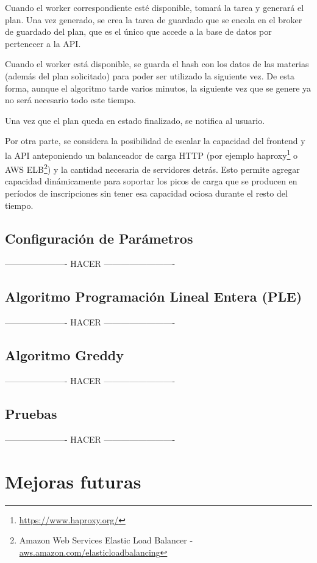 \documentclass[a4paper]{article}
\begin{document}
Cuando el worker correspondiente esté disponible, tomará la tarea y generará el plan. Una vez generado, se crea la tarea de guardado que se encola en el broker de guardado del plan, que es el único que accede a la base de datos por pertenecer a la API.

Cuando el worker está disponible, se guarda el hash con los datos de las materias (además del plan solicitado) para poder ser utilizado la siguiente vez. De esta forma, aunque el algoritmo tarde varios minutos, la siguiente vez que se genere ya no será necesario todo este tiempo.

Una vez que el plan queda en estado finalizado, se notifica al usuario.\newline

Por otra parte, se considera la posibilidad de escalar la capacidad del frontend y la API anteponiendo un balanceador de carga HTTP (por ejemplo haproxy\footnote{\url{https://www.haproxy.org/}} o AWS ELB\footnote{Amazon Web Services Elastic Load Balancer - \url{aws.amazon.com/elasticloadbalancing}}) y la cantidad necesaria de servidores detrás. Esto permite agregar capacidad dinámicamente para soportar los picos de carga que se producen en períodos de inscripciones sin tener esa capacidad ociosa durante el resto del tiempo. 


\subsection{Configuración de Parámetros}
---------------------- HACER -------------------------


\subsection{Algoritmo Programación Lineal Entera (PLE)}
---------------------- HACER -------------------------


\subsection{Algoritmo Greddy}
---------------------- HACER -------------------------


\subsection{Pruebas}
---------------------- HACER -------------------------


\newpage
\section{Mejoras futuras}
\end{document}
